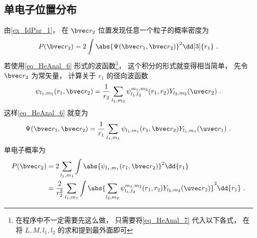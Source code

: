 \subsection{单电子位置分布}
由\autoref{ex_IdPar_1}， 在 $\bvec r_2$ 位置发现任意一个粒子的概率密度为
\begin{equation}\label{eq_HeAnal_24}
P(\bvec r_2) = 2\int \abs{\Psi(\bvec r_1, \bvec r_2)}^2 \dd[3]{r_1}~.
\end{equation}
若使用\autoref{eq_HeAnal_6} 形式的波函数\footnote{在程序中不一定需要先这么做， 只需要将\autoref{eq_HeAnal_7} 代入以下各式， 在将 $L, M, l_1, l_2$ 的求和提到最外面即可}， 这个积分的形式就变得相当简单， 先令 $\bvec r_2$ 为常矢量， 计算关于 $r_1$ 的径向波函数
\begin{equation}\label{eq_HeAnal_15}
\psi_{l_1, m_1}(r_1, \bvec r_2) = \frac{1}{r_2} \sum_{l_2, m_2} \psi_{l_1, l_2}^{m_1, m_2}(r_1, r_2) Y_{l_2, m_2}(\uvec r_2)~.
\end{equation}
这样\autoref{eq_HeAnal_6} 就变为
\begin{equation}
\Psi(\bvec r_1, \bvec r_2) = \frac{1}{r_1} \sum_{l_1, m_1} \psi_{l_1, m_1}(r_1, \bvec r_2) Y_{l_1, m_1} (\uvec r_1)~.
\end{equation}
单电子概率为
\begin{equation}\label{eq_HeAnal_25}
\begin{aligned}
P(\bvec r_2) &= 2\sum_{l_1, m_1} \int \abs{\psi_{l_1, m_1}(r_1, \bvec r_2)}^2 \dd{r_1}\\
& = \frac{2}{r_2^2} \sum_{l_1, m_1} \int \abs{\sum_{l_2, m_2} \psi_{l_1, l_2}^{m_1, m_2}(r_1, r_2) Y_{l_2,m_2}(\uvec r_2)}^2 \dd{r_1}~.
\end{aligned}
\end{equation}

